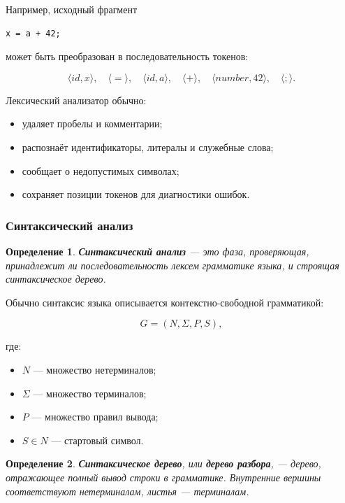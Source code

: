 \documentclass[12pt,a4paper]{article}
\newtheorem{definition}{Определение}
\begin{document}
Например, исходный фрагмент

\begin{lstlisting}
x = a + 42;
\end{lstlisting}

может быть преобразован в последовательность токенов:

\[
\langle id,x\rangle,\quad
\langle = \rangle,\quad
\langle id,a\rangle,\quad
\langle + \rangle,\quad
\langle number,42\rangle,\quad
\langle ; \rangle.
\]

Лексический анализатор обычно:
\begin{itemize}
    \item удаляет пробелы и комментарии;
    \item распознаёт идентификаторы, литералы и служебные слова;
    \item сообщает о недопустимых символах;
    \item сохраняет позиции токенов для диагностики ошибок.
\end{itemize}

\subsubsection{Синтаксический анализ}

\begin{definition}
\textbf{Синтаксический анализ} --- это фаза, проверяющая, принадлежит ли последовательность лексем грамматике языка, и строящая синтаксическое дерево.
\end{definition}

Обычно синтаксис языка описывается контекстно-свободной грамматикой:

\[
G = (N, \Sigma, P, S),
\]

где:
\begin{itemize}
    \item $N$ --- множество нетерминалов;
    \item $\Sigma$ --- множество терминалов;
    \item $P$ --- множество правил вывода;
    \item $S \in N$ --- стартовый символ.
\end{itemize}

\begin{definition}
\textbf{Синтаксическое дерево}, или \textbf{дерево разбора}, --- дерево, отражающее полный вывод строки в грамматике. Внутренние вершины соответствуют нетерминалам, листья --- терминалам.
\end{definition}
\end{document}
